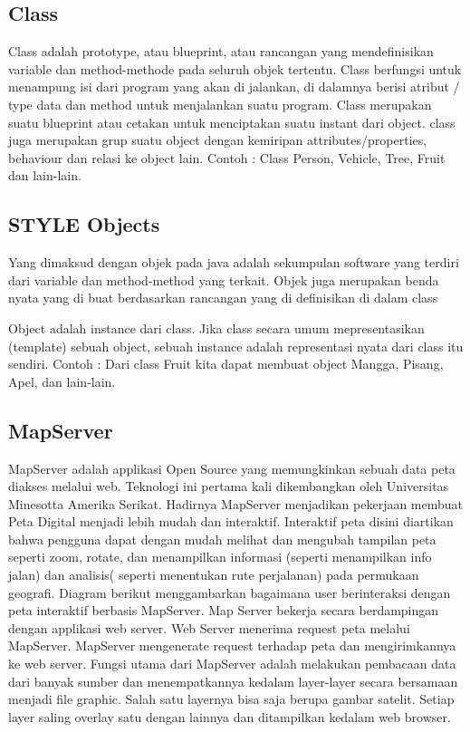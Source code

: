 \subsection{Class}
Class adalah prototype, atau blueprint, atau rancangan yang mendefinisikan variable dan method-methode pada seluruh objek tertentu. 
Class berfungsi untuk menampung isi dari program yang akan di jalankan, di dalamnya berisi atribut / type data dan method untuk menjalankan suatu program.
Class merupakan suatu blueprint atau cetakan untuk menciptakan suatu instant dari  object. 
class juga merupakan grup suatu object dengan kemiripan attributes/properties, behaviour dan relasi ke object lain. 
Contoh : Class Person, Vehicle, Tree, Fruit dan lain-lain.

\subsection{STYLE Objects}
Yang dimaksud dengan objek pada java adalah sekumpulan software yang terdiri dari variable dan method-method yang terkait. 
Objek juga merupakan benda nyata yang di buat berdasarkan rancangan yang di definisikan di dalam class

Object adalah instance dari class. Jika class secara umum mepresentasikan (template) sebuah object, 
sebuah instance adalah representasi nyata dari class itu sendiri. Contoh : Dari class Fruit kita dapat membuat object Mangga, 
Pisang, Apel, dan lain-lain.

\subsection{MapServer}
MapServer adalah applikasi Open Source yang memungkinkan sebuah data peta diakses melalui web. Teknologi ini pertama kali dikembangkan oleh Universitas Minesotta Amerika Serikat. Hadirnya MapServer menjadikan pekerjaan membuat Peta Digital menjadi lebih mudah dan interaktif. Interaktif peta disini diartikan bahwa pengguna dapat dengan mudah melihat dan mengubah tampilan peta seperti zoom, rotate, dan menampilkan informasi (seperti menampilkan info jalan) dan analisis( seperti menentukan rute perjalanan) pada permukaan geografi. Diagram berikut menggambarkan bagaimana user berinteraksi dengan peta interaktif berbasis MapServer.
Map Server bekerja secara berdampingan dengan applikasi web server. Web Server menerima request peta melalui MapServer. MapServer mengenerate request terhadap peta dan mengirimkannya ke web server. Fungsi utama dari MapServer adalah melakukan pembacaan data dari banyak sumber dan menempatkannya kedalam layer-layer secara bersamaan menjadi file graphic. Salah satu layernya bisa saja berupa gambar satelit. Setiap layer saling overlay satu dengan lainnya dan ditampilkan kedalam web browser.

